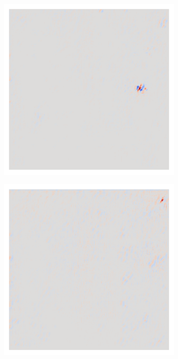 \begin{figure}[H]
\begin{subfigure}{0.095\linewidth}
    \end{subfigure}\hfill%
    \begin{subfigure}{0.095\linewidth}
        \centering
        \includegraphics[height=1\linewidth]{01-images/05-resultate/uap_resnet18/uap0-resnet18-covidx_data-n200-robustificationslevel4.png}
    \end{subfigure}\hfill%
    \begin{subfigure}{0.095\linewidth}
        \centering
        \includegraphics[height=1\linewidth]{01-images/05-resultate/uap_resnet18/uap0-resnet18-covidx_data-n200-robustificationslevel5.png}

\end{subfigure}
\end{figure}
